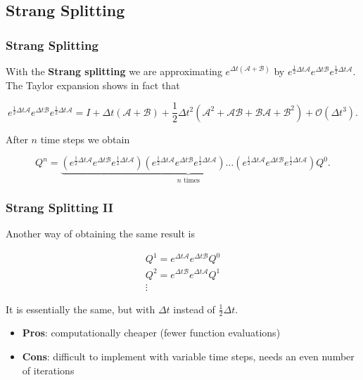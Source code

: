 \documentclass{beamer}
\newcommand{\ca}{\mathcal{A}}
\newcommand{\cb}{\mathcal{B}}
\renewcommand{\d}{\Delta}
\newcommand{\emp}[1]{\textcolor{tum}{\textbf{#1}}}
\begin{document}
\subsection{Strang Splitting}
\begin{frame}
	\frametitle{Strang Splitting}
	With the \emp{Strang splitting} we are approximating $e^{\d t(\ca +\cb)}$ by $e^{\frac{1}{2}\d t\ca}e^{\d t\cb}e^{\frac{1}{2}\d t\ca}$. The Taylor expansion shows in fact that

	\begin{equation}
		e^{\frac{1}{2}\d t\ca}e^{\d t\cb}e^{\frac{1}{2}\d t\ca} = I+\d t(\ca + \cb)+\frac{1}{2}\d t^2(\ca^2+\ca\cb+\cb\ca+\cb^2)+\mathcal{O}(\d t^3).
	\end{equation}

	After $n$ time steps we obtain

	\begin{equation}\label{eq:recursion}
		Q^n = \underbrace{(e^{\frac{1}{2}\d t\ca}e^{\d t\cb}e^{\frac{1}{2}\d t\ca})(e^{\frac{1}{2}\d t\ca}e^{\d t\cb}e^{\frac{1}{2}\d t\ca})\dots(e^{\frac{1}{2}\d t\ca}e^{\d t\cb}e^{\frac{1}{2}\d t\ca})}_{n\text{ times}}Q^0.
	\end{equation}


\end{frame}

\begin{frame}
	\frametitle{Strang Splitting II}

	Another way of obtaining the same result is

	\begin{equation}
		\begin{gathered}
			Q^1 = e^{\d t\ca}e^{\d t\cb}Q^0\\
			Q^2 = e^{\d t\cb}e^{\d t\ca}Q^1\\
			\vdots
		\end{gathered}
	\end{equation}

	It is essentially the same, but with $\d t$ instead of $\frac{1}{2}\d t$.

	\begin{itemize}
		\item \textbf{Pros}: computationally cheaper (fewer function evaluations)
		\item \textbf{Cons}: difficult to implement with variable time steps, needs an even number of iterations
	\end{itemize}
\end{frame}
\end{document}
